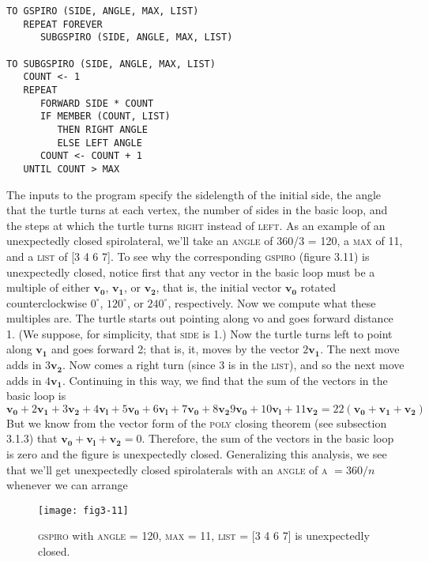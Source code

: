 \documentclass{book}
\begin{document}
\begin{verbatim}
TO GSPIRO (SIDE, ANGLE, MAX, LIST)
   REPEAT FOREVER
      SUBGSPIRO (SIDE, ANGLE, MAX, LIST)

TO SUBGSPIRO (SIDE, ANGLE, MAX, LIST)
   COUNT <- 1
   REPEAT
      FORWARD SIDE * COUNT
      IF MEMBER (COUNT, LIST)
         THEN RIGHT ANGLE
         ELSE LEFT ANGLE
      COUNT <- COUNT + 1
   UNTIL COUNT > MAX
\end{verbatim}
The inputs to the program specify the sidelength of the initial side, the
angle that the turtle turns at each vertex, the number of sides in the
basic loop, and the steps at which the turtle turns \textsc{right} instead of \textsc{left}.
As an example of an unexpectedly closed spirolateral, we'll take an
\textsc{angle} of 360/3 = 120, a \textsc{max} of 11, and a \textsc{list} of [3 4 6 7]. To
see why the corresponding \textsc{gspiro} (figure 3.11) is unexpectedly closed,
notice first that any vector in the basic loop must be a multiple of either
$\mathbf{v_0}$, $\mathbf{v_1}$, or $\mathbf{v_2}$, that is, the initial vector $\mathbf{v_0}$ rotated counterclockwise $0^{\circ}$,
$120^{\circ}$, or $240^{\circ}$, respectively. Now we compute what these multiples are.
The turtle starts out pointing along vo and goes forward distance 1. (We
suppose, for simplicity, that \textsc{side} is 1.) Now the turtle turns left to point
along $\mathbf{v_1}$ and goes forward 2; that is, it, moves by the vector $2\mathbf{v_1}$. The
next move adds in $3\mathbf{v_2}$. Now comes a right turn (since 3 is in the \textsc{list}),
and so the next move adds in $4\mathbf{v_1}$. Continuing in this way, we find that
the sum of the vectors in the basic loop is $$\mathbf{v_0} + 2\mathbf{v_1} + 3\mathbf{v_2} + 4\mathbf{v_l} + 5\mathbf{v_0} + 6\mathbf{v_l} + 7\mathbf{v_0} + 8\mathbf{v_2}  9\mathbf{v_0} + 10\mathbf{v_l} + 11\mathbf{v_2} = 22(\mathbf{v_0} + \mathbf{v_1} + \mathbf{v_2})$$ But we know from the vector form of the \textsc{poly} closing theorem (see
subsection 3.1.3) that $\mathbf{v_0} + \mathbf{v_l} + \mathbf{v_2} = 0$. Therefore, the sum of the
vectors in the basic loop is zero and the figure is unexpectedly closed.
Generalizing this analysis, we see that we'll get unexpectedly closed
spirolaterals with an \textsc{angle} of \textsc{a} $= 360/n$ whenever we can arrange

\begin{figure}
\begin{center}
\texttt{[image: fig3-11]}
\caption{\textsc{gspiro} with \textsc{angle} = 120, \textsc{max} = 11, \textsc{list} = [3 4 6 7] is unexpectedly closed.}
\end{center}
\end{figure}
\end{document}
